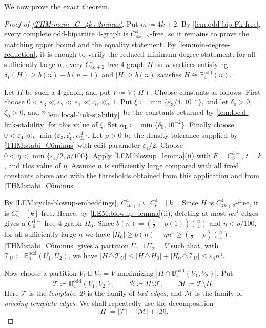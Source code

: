 \documentclass[10pt,a4paper]{article}
\theoremstyle{plain}
\theoremstyle{definition}
\begin{document}
We now prove the exact theorem.

\begin{proof}[Proof of \cref{THM:main_C_4k+2minus}]
Put $m\coloneqq4k+2$. By \cref{lem:odd-bip-Fk-free}, every complete odd-bipartite $4$-graph is $C_{4k+2}^{4-}$-free, so it remains to prove the matching upper bound and the equality statement. By \cref{lem:min-degree-reduction}, it is enough to verify the reduced minimum-degree statement: for all sufficiently large $n$, every $C_{4k+2}^{4-}$-free $4$-graph $H$ on $n$ vertices satisfying $\delta_1(H)\ge b(n)-b(n-1)$ and $|H|\ge b(n)$ satisfies $H\cong \mathbb{B}_4^{\mathrm{odd}}(n)$.

Let $H$ be such a $4$-graph, and put $V\coloneqq V(H)$. Choose constants as follows. First choose $0<\varepsilon_3\ll \varepsilon_2\ll \varepsilon_1\ll c_0\ll_k 1$. 
Put $\xi\coloneqq\min\{\varepsilon_3/4,10^{-5}\}$,
and let $\delta_0>0$, $\zeta_0>0$, and $n_{\ref{lem:local-link-stability}}$ be the constants returned by \cref{lem:local-link-stability} for this value of $\xi$. Set
$\alpha_{\mathrm L}\coloneqq\min\{\delta_0,10^{-2}\}$.
Finally choose $0<\varepsilon_4\ll_k \min\{\varepsilon_3,\zeta_0,\alpha_{\mathrm L}^4\}$. 
Let $\rho>0$ be the density tolerance supplied by \cref{THM:stabi_C6minus} with edit parameter $\varepsilon_4/2$.  Choose
$0<\eta<\min\{\varepsilon_4/2,\rho/100\}$.
Apply \cref{LEM:blowup_lemma}\textup{(ii)} with $F=C_6^{4-}$, $t=k$, and this value of $\eta$.  Assume $n$ is sufficiently large compared with all fixed constants above and with the thresholds obtained from this application and from \cref{THM:stabi_C6minus}.

By \cref{LEM:cycle-blowup-embeddings}, $C_{4k+2}^{4-}\subseteq C_6^{4-}[k]$.  Since $H$ is $C_{4k+2}^{4-}$-free, it is $C_6^{4-}[k]$-free.  Hence, by \cref{LEM:blowup_lemma}\textup{(ii)}, deleting at most $\eta n^4$ edges gives a $C_6^{4-}$-free $4$-graph $H_0$.  Since $b(n)=\left(\frac12+o(1)\right)\binom n4$ and $\eta<\rho/100$, for all sufficiently large $n$ we have $|H_0|\ge b(n)-\eta n^4\ge \left(\frac12-\rho\right)\binom n4$. 
\cref{THM:stabi_C6minus} gives a partition $U_1\sqcup U_2=V$ such that, with $\mathcal T_U\coloneqq\mathbb{B}_4^{\mathrm{odd}}(U_1,U_2)$, we have $|H\triangle \mathcal T_U|\le |H\triangle H_0|+|H_0\triangle \mathcal T_U|\le \varepsilon_4n^4$. 

Now choose a partition $V_1\sqcup V_2=V$ maximizing $|H\cap \mathbb{B}_4^{\mathrm{odd}}(V_1,V_2)|$. 
Put
\[
\mathcal T\coloneqq\mathbb{B}_4^{\mathrm{odd}}(V_1,V_2),\qquad
\mathcal B\coloneqq H\setminus \mathcal T,\qquad
\mathcal M\coloneqq\mathcal T\setminus H.
\]
Here $\mathcal T$ is the \emph{template}, $\mathcal B$ is the family of \emph{bad edges}, and $\mathcal M$ is the family of \emph{missing template edges}.
We shall repeatedly use the decomposition
\begin{equation}\label{eq:H-decomposition-final}
|H|=|\mathcal T|-|\mathcal M|+|\mathcal B|.
\end{equation}


\end{proof}
\end{document}
